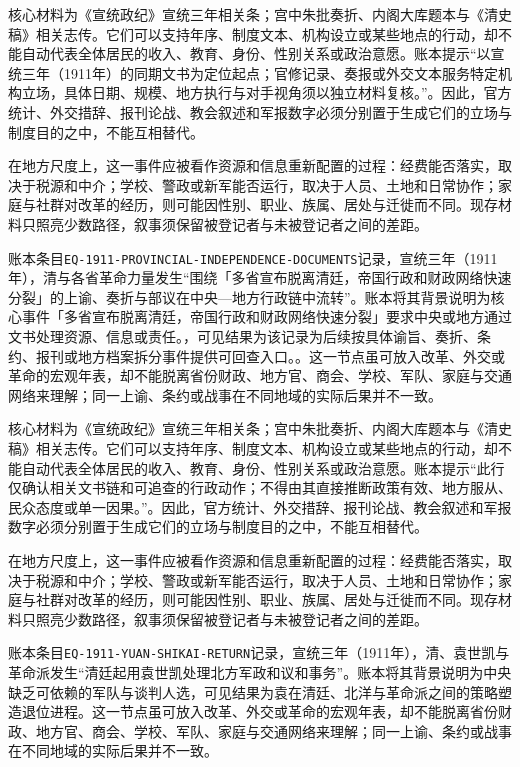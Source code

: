 核心材料为《宣统政纪》宣统三年相关条；宫中朱批奏折、内阁大库题本与《清史稿》相关志传。它们可以支持年序、制度文本、机构设立或某些地点的行动，却不能自动代表全体居民的收入、教育、身份、性别关系或政治意愿。账本提示“以宣统三年（1911年）的同期文书为定位起点；官修记录、奏报或外交文本服务特定机构立场，具体日期、规模、地方执行与对手视角须以独立材料复核。”。因此，官方统计、外交措辞、报刊论战、教会叙述和军报数字必须分别置于生成它们的立场与制度目的之中，不能互相替代。

在地方尺度上，这一事件应被看作资源和信息重新配置的过程：经费能否落实，取决于税源和中介；学校、警政或新军能否运行，取决于人员、土地和日常协作；家庭与社群对改革的经历，则可能因性别、职业、族属、居处与迁徙而不同。现存材料只照亮少数路径，叙事须保留被登记者与未被登记者之间的差距。

账本条目\texttt{EQ-1911-PROVINCIAL-INDEPENDENCE-DOCUMENTS}记录，宣统三年（1911年），清与各省革命力量发生“围绕「多省宣布脱离清廷，帝国行政和财政网络快速分裂」的上谕、奏折与部议在中央—地方行政链中流转”。账本将其背景说明为核心事件「多省宣布脱离清廷，帝国行政和财政网络快速分裂」要求中央或地方通过文书处理资源、信息或责任。，可见结果为该记录为后续按具体谕旨、奏折、条约、报刊或地方档案拆分事件提供可回查入口。。这一节点虽可放入改革、外交或革命的宏观年表，却不能脱离省份财政、地方官、商会、学校、军队、家庭与交通网络来理解；同一上谕、条约或战事在不同地域的实际后果并不一致。

核心材料为《宣统政纪》宣统三年相关条；宫中朱批奏折、内阁大库题本与《清史稿》相关志传。它们可以支持年序、制度文本、机构设立或某些地点的行动，却不能自动代表全体居民的收入、教育、身份、性别关系或政治意愿。账本提示“此行仅确认相关文书链和可追查的行政动作；不得由其直接推断政策有效、地方服从、民众态度或单一因果。”。因此，官方统计、外交措辞、报刊论战、教会叙述和军报数字必须分别置于生成它们的立场与制度目的之中，不能互相替代。

在地方尺度上，这一事件应被看作资源和信息重新配置的过程：经费能否落实，取决于税源和中介；学校、警政或新军能否运行，取决于人员、土地和日常协作；家庭与社群对改革的经历，则可能因性别、职业、族属、居处与迁徙而不同。现存材料只照亮少数路径，叙事须保留被登记者与未被登记者之间的差距。

账本条目\texttt{EQ-1911-YUAN-SHIKAI-RETURN}记录，宣统三年（1911年），清、袁世凯与革命派发生“清廷起用袁世凯处理北方军政和议和事务”。账本将其背景说明为中央缺乏可依赖的军队与谈判人选，可见结果为袁在清廷、北洋与革命派之间的策略塑造退位进程。这一节点虽可放入改革、外交或革命的宏观年表，却不能脱离省份财政、地方官、商会、学校、军队、家庭与交通网络来理解；同一上谕、条约或战事在不同地域的实际后果并不一致。

